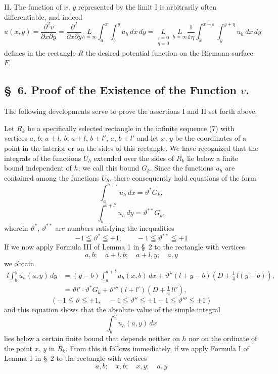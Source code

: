 \documentclass{article}
\begin{document}
II. The function of $x$, $y$ represented by the limit I is arbitrarily often differentiable, and indeed
\[
u(x, y) = \frac{\partial^2 v}{\partial x \partial y} = \frac{\partial^2}{\partial x \partial y} \underset{h=\infty}{L} \int_a^x \int_b^y u_h\,dx\,dy = \underset{\substack{\varepsilon=0 \\ \eta=0}}{L} \ \underset{h=\infty}{L} \frac{1}{\varepsilon\eta} \int_x^{x+\varepsilon} \int_y^{y+\eta} u_h\,dx\,dy \tag{II}
\]
defines in the rectangle $R$ the desired potential function on the Riemann surface $F$.


\subsection*{§~6. Proof of the Existence of the Function $v$.}

The following developments serve to prove the assertions I and II set forth above.

Let $R_k$ be a specifically selected rectangle in the infinite sequence (7) with vertices $a$, $b$; $a+l$, $b$; $a+l$, $b+l'$; $a$, $b+l'$ and let $x$, $y$ be the coordinates of a point in the interior or on the sides of this rectangle. We have recognized that the integrals of the functions $U_h$ extended over the sides of $R_k$ lie below a finite bound independent of $h$; we call this bound $G_k$. Since the functions $u_h$ are contained among the functions $U_h$, there consequently hold equations of the form
\[
\int_a^{a+l} u_h\,dx = \vartheta^* G_k,
\]
\[
\int_b^{b+l'} u_h\,dy = \vartheta^{**} G_k,
\]
wherein $\vartheta^*$, $\vartheta^{**}$ are numbers satisfying the inequalities
\[
-1 \leqq \vartheta^* \leqq +1, \qquad -1 \leqq \vartheta^{**} \leqq +1
\]
If we now apply Formula III of Lemma 1 in §~2 to the rectangle with vertices
\[
a, b; \quad a+l, b; \quad a+l, y; \quad a, y
\]
we obtain
\[
\begin{aligned}
l \int_b^y u_h(a, y)\,dy &= (y-b) \int_a^{a+l} u_h(x, b)\,dx + \vartheta''(l+y-b)\left(D + \frac{1}{4}\,l(y-b)\right), \\
&= \vartheta l' \cdot \vartheta^* G_k + \vartheta''' (l+l') \left(D + \frac{1}{4}\,l l'\right),
\end{aligned}
\]
\[
(-1 \leqq \vartheta \leqq +1, \quad -1 \leqq \vartheta'' \leqq +1 - 1 \leqq \vartheta''' \leqq +1)
\]
%
and this equation shows that the absolute value of the simple integral
\[
\int_b^y u_h(a, y)\,dx
\]
lies below a certain finite bound that depends neither on $h$ nor on the ordinate of the point $x$, $y$ in $R_k$. From this it follows immediately, if we apply Formula I of Lemma 1 in §~2 to the rectangle with vertices
\[
a, b; \quad x, b; \quad x, y; \quad a, y
\]
\end{document}
